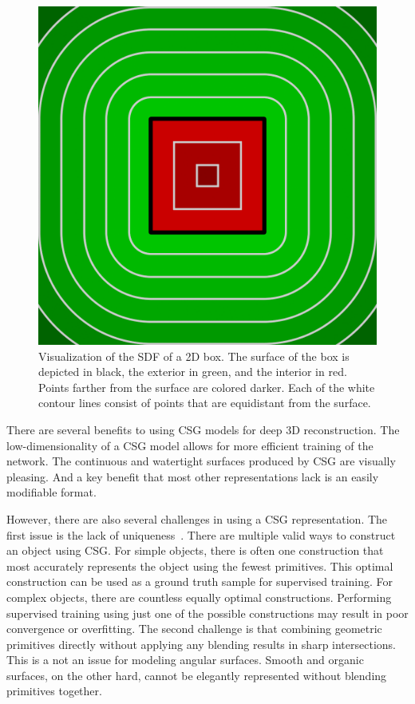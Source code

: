 \begin{figure}
	\centering
	\includegraphics[scale=0.2]{Images/SDF Box}
	\caption{Visualization of the SDF of a 2D box. The surface of the box is depicted in black, the exterior in green, and the interior in red. Points farther from the surface are colored darker. Each of the white contour lines consist of points that are equidistant from the surface.}
	\label{fig:sdf_box}
\end{figure}

There are several benefits to using CSG models for deep 3D reconstruction. The low-dimensionality of a CSG model allows for more efficient training of the network. The continuous and watertight surfaces produced by CSG are visually pleasing. And a key benefit that most other representations lack is an easily modifiable format.

However, there are also several challenges in using a CSG representation. The first issue is the lack of uniqueness~\cite{Hughes2013}. There are multiple valid ways to construct an object using CSG. For simple objects, there is often one construction that most accurately represents the object using the fewest primitives. This optimal construction can be used as a ground truth sample for supervised training. For complex objects, there are countless equally optimal constructions. Performing supervised training using just one of the possible constructions may result in poor convergence or overfitting. The second challenge is that combining geometric primitives directly without applying any blending results in sharp intersections. This is a not an issue for modeling angular surfaces. Smooth and organic surfaces, on the other hard, cannot be elegantly represented without blending primitives together.

